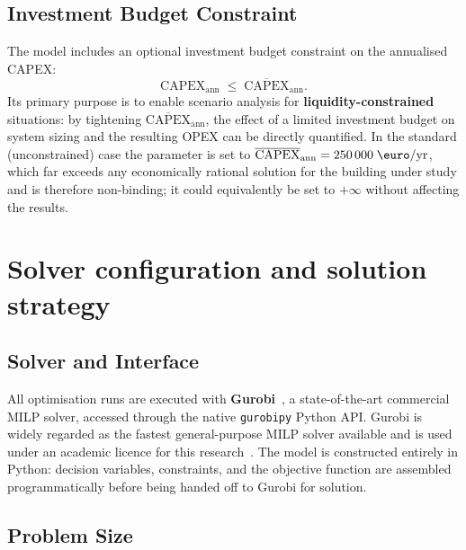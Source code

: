\documentclass[11pt,a4paper]{report}
\begin{document}
\subsection*{Investment Budget Constraint}

The model includes an optional investment budget constraint on the annualised
CAPEX:
\begin{equation}
    \mathrm{CAPEX}_\mathrm{ann} \;\leq\; \overline{\mathrm{CAPEX}}_\mathrm{ann}.
    \label{eq:capex_budget}
\end{equation}
Its primary purpose is to enable scenario analysis for \textbf{liquidity-constrained}
situations: by tightening $\overline{\mathrm{CAPEX}}_\mathrm{ann}$, the effect of a
limited investment budget on system sizing and the resulting OPEX can be directly
quantified.
In the standard (unconstrained) case the parameter is set to
$\overline{\mathrm{CAPEX}}_\mathrm{ann} = 250\,000\;\text{\euro/yr}$, which far
exceeds any economically rational solution for the building under study and is
therefore non-binding; it could equivalently be set to $+\infty$ without
affecting the results.


\section{Solver configuration and solution strategy}
\label{sec:solver_settings}

\subsection*{Solver and Interface}

All optimisation runs are executed with \textbf{Gurobi}~\cite{gurobi}, a
state-of-the-art commercial MILP solver, accessed through the native
\texttt{gurobipy} Python API.
Gurobi is widely regarded as the fastest general-purpose MILP solver available
and is used under an academic licence for this research~\cite{gurobi}.
The model is constructed entirely in Python: decision variables, constraints, and
the objective function are assembled programmatically before being handed off to
Gurobi for solution.

\subsection*{Problem Size}
\end{document}
